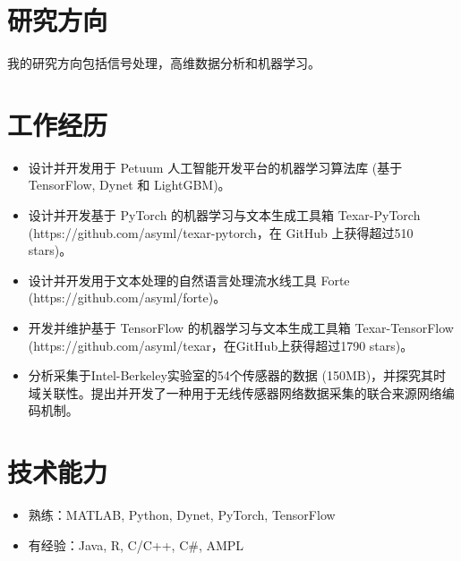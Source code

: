 \documentclass{resume}
\begin{document}


\section{研究方向}
我的研究方向包括信号处理，高维数据分析和机器学习。

\section{工作经历}
\begin{itemize}
\item 设计并开发用于 Petuum 人工智能开发平台的机器学习算法库 (基于 TensorFlow, Dynet 和 LightGBM)。
\item 设计并开发基于 PyTorch 的机器学习与文本生成工具箱 Texar-PyTorch (https://github.com/asyml/texar-pytorch，在 GitHub 上获得超过510 stars)。
\item 设计并开发用于文本处理的自然语言处理流水线工具 Forte (https://github.com/asyml/forte)。
\item 开发并维护基于 TensorFlow 的机器学习与文本生成工具箱 Texar-TensorFlow (https://github.com/asyml/texar，在GitHub上获得超过1790 stars)。
\end{itemize}

\begin{itemize}
\item 分析采集于Intel-Berkeley实验室的54个传感器的数据 (150MB)，并探究其时域关联性。提出并开发了一种用于无线传感器网络数据采集的联合来源网络编码机制。
\end{itemize}


\section{技术能力}
\begin{itemize}[parsep=0.2ex]
\item 熟练：MATLAB, Python, Dynet, PyTorch, TensorFlow
\item 有经验：Java, R, C/C++, C\#, AMPL
\end{itemize}
\end{document}
